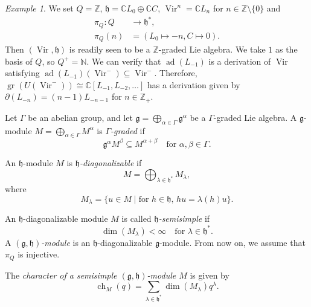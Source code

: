 \documentclass[a4paper, 12pt, reqno]{amsart}
\theoremstyle{remark}
\newtheorem{example}[theorem]{Example}
\DeclareMathOperator{\Vir}{Vir}
\DeclareMathOperator{\ch}{ch}
\DeclareMathOperator{\gr}{gr}
\DeclareMathOperator{\ad}{ad}
\begin{document}
\begin{example}
  \label{exa:2}
  We set $Q = \mathbb{Z}$, $\mathfrak{h} = \mathbb{C}L_0 \oplus \mathbb{C}C$, $\Vir^n = \mathbb{C}L_n$ for $n \in \mathbb{Z} \setminus \{0\}$ and
  \begin{align*}
    \pi_Q: Q &\to \mathfrak{h}^*, \\
    \pi_Q(n) &= (L_0 \mapsto -n, C \mapsto 0).
  \end{align*}
  Then $(\Vir, \mathfrak{h})$ is readily seen to be a $\mathbb{Z}$-graded Lie algebra.
  We take $1$ as the basis of $Q$, so $Q^+ = \mathbb{N}$.
  We can verify that $\ad(L_{-1})$ is a derivation of $\Vir$ satisfying $\ad(L_{-1})(\Vir^-) \subseteq \Vir^-$.
  Therefore, $\gr(U(\Vir^-)) \cong \mathbb{C}[L_{-1}, L_{-2}, \dots]$ has a derivation given by $\partial(L_{-n}) = (n - 1)L_{-n - 1}$ for $n \in \mathbb{Z}_+$.
\end{example}

Let $\Gamma$ be an abelian group, and let $\mathfrak{g} = \bigoplus_{\alpha \in \Gamma}\mathfrak{g}^{\alpha}$ be a $\Gamma$-graded Lie algebra.
A $\mathfrak{g}$-module $M = \bigoplus_{\alpha \in \Gamma}M^{\alpha}$ is \emph{$\Gamma$-graded} if
\begin{equation*}
  \mathfrak{g}^{\alpha}M^{\beta} \subseteq M^{\alpha + \beta} \quad \text{for $\alpha, \beta \in \Gamma$}.
\end{equation*}

An $\mathfrak{h}$-module $M$ is \emph{$\mathfrak{h}$-diagonalizable} if
\begin{equation*}
  M = \bigoplus_{\lambda \in \mathfrak{h}^*}M_{\lambda},
\end{equation*}
where
\begin{equation*}
  M_{\lambda} = \{u \in M \mid \text{for $h \in \mathfrak{h}$, $hu = \lambda(h)u$}\}.
\end{equation*}

An $\mathfrak{h}$-diagonalizable module $M$ is called \emph{$\mathfrak{h}$-semisimple} if
\begin{equation*}
  \dim(M_{\lambda}) < \infty \quad \text{for $\lambda \in \mathfrak{h}^*$}.
\end{equation*}
A \emph{$(\mathfrak{g}, \mathfrak{h})$-module} is an $\mathfrak{h}$-diagonalizable $\mathfrak{g}$-module.
From now on, we assume that $\pi_Q$ is injective.

The \emph{character of a semisimple $(\mathfrak{g}, \mathfrak{h})$-module $M$} is given by
\begin{equation*}
  \ch_M(q) = \sum_{\lambda \in \mathfrak{h}^*}\dim(M_{\lambda})q^{\lambda}.
\end{equation*}
\end{document}

